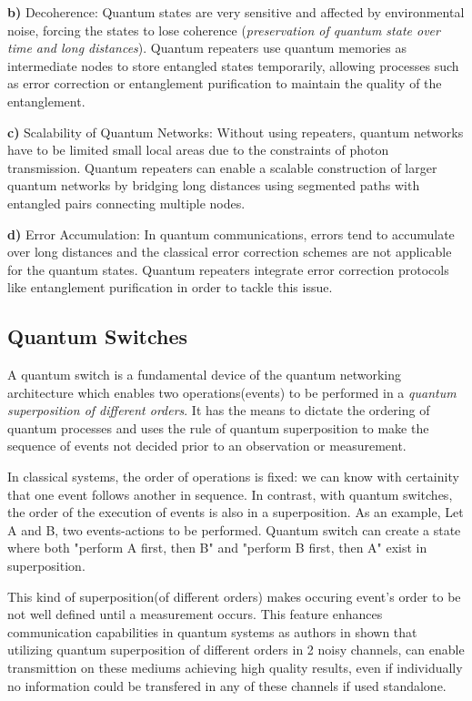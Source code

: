 \documentclass[12pt]{ieeetj}
\begin{document}
		\textbf{b)} Decoherence:
		Quantum states are very sensitive and affected by environmental noise, forcing the states to lose coherence (\textit{preservation of quantum
		state over time and long distances}).
		Quantum repeaters use quantum memories\cite{memories} as intermediate nodes to store entangled states 
		temporarily, allowing processes such as error correction or entanglement purification to maintain 
		the quality of the entanglement.
		
		\textbf{c)} Scalability of Quantum Networks:
		Without using repeaters, quantum networks have to be limited small local areas due to the
		constraints of photon transmission.
		Quantum repeaters can enable a scalable construction 
		of larger quantum networks by bridging long distances using segmented 
		paths with entangled pairs connecting multiple nodes.
		
		\textbf{d)} Error Accumulation:
		In quantum communications, errors tend to accumulate over long distances
		and the classical error correction schemes are not applicable for the quantum states.
		Quantum repeaters integrate error correction protocols like entanglement purification
		in order to tackle this issue.

		\subsection{Quantum Switches}
		
		A quantum switch is a fundamental device of the quantum networking 
		architecture which
		enables two operations(events) to be performed in a \textit{quantum superposition of different orders}. 
		It has the means to dictate the ordering of quantum processes and
		uses the rule of quantum superposition to make the sequence of events not decided 
		prior to an observation or measurement.

		In classical systems, the order of operations is fixed: we can know with certainity that one event follows another in sequence. 
		In contrast, with quantum switches, the order of the execution of events is also in a superposition.
		As an example,
		Let A and B, two events-actions to be performed. Quantum switch can create a state where both "perform A first, then B"
		and "perform B first, then A" exist in superposition.

		This kind of superposition(of different orders) makes occuring event's order to be not well defined until
		a measurement occurs. This feature enhances communication capabilities in quantum systems as authors in \cite{superposition-orders-proof}
		shown that utilizing quantum superposition of different orders in 2 noisy channels, 
		can enable transmittion on these mediums achieving high quality results,
		even if individually no information could be transfered in any of these channels if used standalone. 
\end{document}
